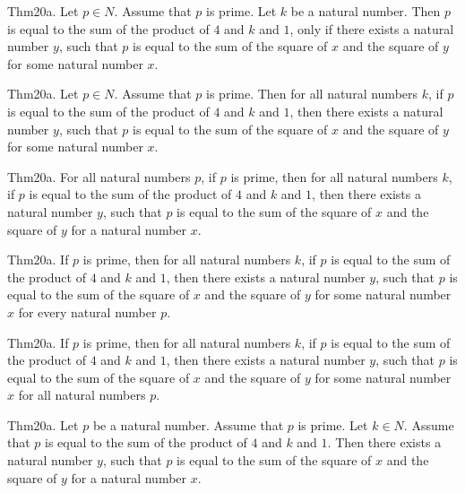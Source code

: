 \documentclass{article}
\begin{document}
Thm20a. Let $p \in N$. Assume that $p$ is prime. Let $k$ be a natural number. Then $p$ is equal to the sum of the product of $4$ and $k$ and $1$, only if there exists a natural number $y$, such that $p$ is equal to the sum of the square of $x$ and the square of $y$ for some natural number $x$.

Thm20a. Let $p \in N$. Assume that $p$ is prime. Then for all natural numbers $k$, if $p$ is equal to the sum of the product of $4$ and $k$ and $1$, then there exists a natural number $y$, such that $p$ is equal to the sum of the square of $x$ and the square of $y$ for some natural number $x$.

Thm20a. For all natural numbers $p$, if $p$ is prime, then for all natural numbers $k$, if $p$ is equal to the sum of the product of $4$ and $k$ and $1$, then there exists a natural number $y$, such that $p$ is equal to the sum of the square of $x$ and the square of $y$ for a natural number $x$.

Thm20a. If $p$ is prime, then for all natural numbers $k$, if $p$ is equal to the sum of the product of $4$ and $k$ and $1$, then there exists a natural number $y$, such that $p$ is equal to the sum of the square of $x$ and the square of $y$ for some natural number $x$ for every natural number $p$.

Thm20a. If $p$ is prime, then for all natural numbers $k$, if $p$ is equal to the sum of the product of $4$ and $k$ and $1$, then there exists a natural number $y$, such that $p$ is equal to the sum of the square of $x$ and the square of $y$ for some natural number $x$ for all natural numbers $p$.

Thm20a. Let $p$ be a natural number. Assume that $p$ is prime. Let $k \in N$. Assume that $p$ is equal to the sum of the product of $4$ and $k$ and $1$. Then there exists a natural number $y$, such that $p$ is equal to the sum of the square of $x$ and the square of $y$ for a natural number $x$.
\end{document}

